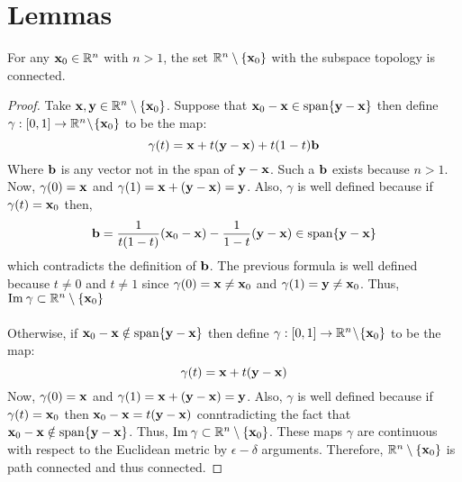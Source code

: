\documentclass[12pt]{extarticle}
\begin{document}
\section*{Lemmas}


\begin{lemma} \label{subrnconnected}
For any $\bf{x}_0 \in \R^n$ with $n > 1$, the set $\R^n \setminus \{\bf{x}_0\}$ with the subspace topology is connected. 
\end{lemma}
\begin{proof}
Take $\bf{x}, \bf{y} \in \R^n \setminus \{\bf{x}_0 \}$. Suppose that $\bf{x}_0 - \bf{x} \in \vspan{\bf{y} - \bf{x}}$ then define $\gamma : [0, 1] \to \R^n \sm \{\bf{x}_0\}$ to be the map: \[\gamma(t) = \bf{x} + t (\bf{y} - \bf{x}) + t(1 - t) \bf{b}\] Where $\bf{b}$ is any vector not in the span of $\bf{y} - \bf{x}$. Such a $\bf{b}$ exists because $n > 1$. Now, $\gamma(0) = \bf{x}$ and $\gamma(1) = \bf{x} + (\bf{y} - \bf{x}) = \bf{y}$. Also, $\gamma$ is well defined because if $\gamma(t) = \bf{x}_0$ then, \[\bf{b} = \frac{1}{t(1-t)} (\bf{x}_0 - \bf{x}) - \frac{1}{1 - t} (\bf{y} - \bf{x}) \in \vspan{\bf{y} - \bf{x}}\] which contradicts the definition of $\bf{b}$. The previous formula is well defined because $t \neq 0$ and $t \neq 1$ since $\gamma(0) = \bf{x} \neq \bf{x}_0$ and $\gamma(1) = \bf{y} \neq \bf{x}_0$. Thus, $\Im{\gamma} \subset \R^n \setminus \{\bf{x}_0 \}$  \\ \\ Otherwise, if $\bf{x}_0 - \bf{x} \notin \vspan{\bf{y} - \bf{x}}$ then define $\gamma : [0, 1] \to \R^n \sm \{\bf{x}_0\}$ to be the map: \[\gamma(t) = \bf{x} + t (\bf{y} - \bf{x})\]  Now, $\gamma(0) = \bf{x}$ and $\gamma(1) = \bf{x} + (\bf{y} - \bf{x}) = \bf{y}$. Also, $\gamma$ is well defined because if $\gamma(t) = \bf{x}_0$ then $\bf{x}_0 - \bf{x} = t(\bf{y} - \bf{x})$ conntradicting the fact that $\bf{x}_0 - \bf{x} \notin \vspan{\bf{y} - \bf{x}}$. Thus, $\Im{\gamma} \subset \R^n \setminus \{\bf{x}_0 \}$. These maps $\gamma$ are continuous with respect to the Euclidean metric by $\epsilon-\delta$ arguments. Therefore, $\R^n \setminus \{\bf{x}_0\}$ is path connected and thus connected.  
\end{proof}
\end{document}
